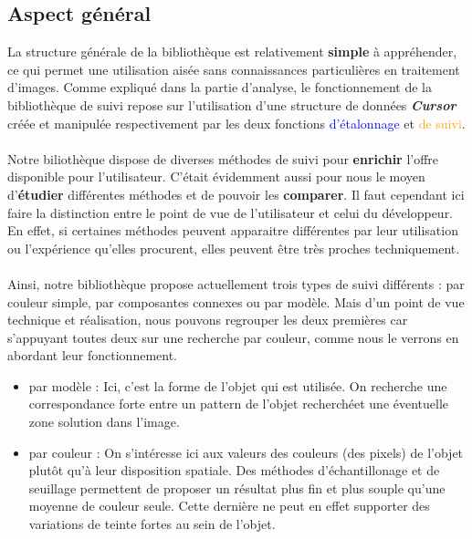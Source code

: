 \documentclass{report}
\begin{document}
				\subsection{Aspect général}
				La structure générale de la bibliothèque est relativement \textbf{simple} à appréhender, ce qui permet une utilisation aisée sans connaissances particulières en traitement d'images. Comme expliqué dans la partie d'analyse, le fonctionnement de la bibliothèque de suivi repose sur l'utilisation d'une structure de données \textbf{\textit{Cursor}} créée et manipulée respectivement par les deux fonctions \textcolor{blue}{d'étalonnage} et \textcolor{orange}{de suivi}.
				\paragraph{} Notre biliothèque dispose de diverses méthodes de suivi pour \textbf{enrichir} l'offre disponible pour l'utilisateur. C'était évidemment aussi pour nous le moyen d'\textbf{étudier} différentes méthodes et de pouvoir les \textbf{comparer}. Il faut cependant ici faire la distinction entre le point de vue de l'utilisateur et celui du développeur. En effet, si certaines méthodes peuvent apparaitre différentes par leur utilisation ou l'expérience qu'elles procurent, elles peuvent être très proches techniquement.
				\paragraph{}Ainsi, notre bibliothèque propose actuellement trois types de suivi différents : par couleur simple, par composantes connexes ou par modèle. Mais d'un point de vue technique et réalisation, nous pouvons regrouper les deux premières car s'appuyant toutes deux sur une recherche par couleur, comme nous le verrons en abordant leur fonctionnement.\\
				\begin{itemize}
\item {\textcolor{marron}{par modèle} : } Ici, c'est la forme de l'objet qui est utilisée. On recherche une correspondance forte entre un pattern de l'objet recherchéet une éventuelle zone solution dans l'image. \\
\item {\textcolor{vert}{par couleur} : } On s'intéresse ici aux valeurs des couleurs (des pixels) de l'objet plutôt qu'à leur disposition spatiale. Des méthodes d'échantillonage et de seuillage permettent de proposer un résultat plus fin et plus souple qu'une moyenne de couleur seule. Cette dernière ne peut en effet supporter des variations de teinte fortes au sein de l'objet.
				\end{itemize}
							
\end{document}
